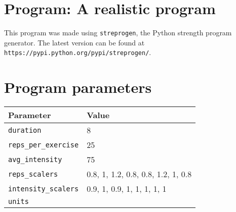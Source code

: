 \documentclass[12pt, a4paper]{article}%
\begin{document}
\large

\section*{Program: A realistic program}

This program was made using \verb|streprogen|,
the Python strength program generator.
The latest version can be found at \\
\verb|https://pypi.python.org/pypi/streprogen/|.


\section*{Program parameters}
\begin{tabular}{l|l}
	\textbf{Parameter} & \textbf{Value} \\ \hline
	\verb|duration|             & 8 \\
	\verb|reps_per_exercise|    & 25 \\
	\verb|avg_intensity|        & 75 \\
	\verb|reps_scalers|         & 0.8, 1, 1.2, 0.8, 0.8, 1.2, 1, 0.8 \\
	\verb|intensity_scalers|    & 0.9, 1, 0.9, 1, 1, 1, 1, 1 \\
	\verb|units|                & 
\end{tabular}
\end{document}
